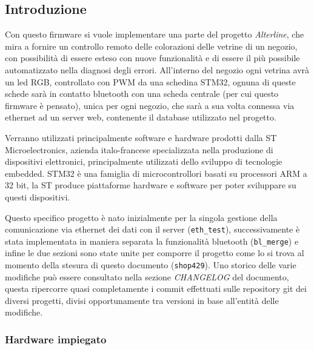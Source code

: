 
\subsection{Introduzione}

Con questo firmware si vuole implementare una parte del progetto \textit{Alterline}, che mira a fornire un controllo remoto delle colorazioni delle vetrine di un negozio, con possibilit\`a di essere esteso con nuove funzionalit\`a e di essere il pi\`u possibile automatizzato nella diagnosi degli errori. All'interno del negozio ogni vetrina avr\`a un led RGB, controllato con PWM da una schedina STM32, ognuna di queste schede sar\`a in contatto bluetooth con una scheda centrale (per cui questo firmware \`e pensato), unica per ogni negozio, che sar\`a a sua volta connessa via ethernet ad un server web, contenente il database utilizzato nel progetto.

Verranno utilizzati principalmente software e hardware prodotti dalla ST Microelectronics, azienda italo-francese specializzata nella produzione di dispositivi elettronici, principalmente utilizzati dello sviluppo di tecnologie embedded. STM32 \`e una famiglia di microcontrollori basati su processori ARM a 32 bit, la ST produce piattaforme hardware e software per poter sviluppare su questi dispositivi.

Questo specifico progetto \`e nato inizialmente per la singola gestione della comunicazione via ethernet dei dati con il server (\texttt{eth\_test}), successivamente \`e stata implementata in maniera separata la funzionalit\`a bluetooth (\texttt{bl\_merge}) e infine le due sezioni sono state unite per comporre il progetto come lo si trova al momento della stesura di questo documento (\texttt{shop429}). Uno storico delle varie modifiche pu\`o essere consultato nella sezione \textit{CHANGELOG} del documento, questa ripercorre quasi completamente i commit effettuati sulle repository git dei diversi progetti, divisi opportunamente tra versioni in base all'entit\`a delle modifiche.

\subsubsection{Hardware impiegato}


